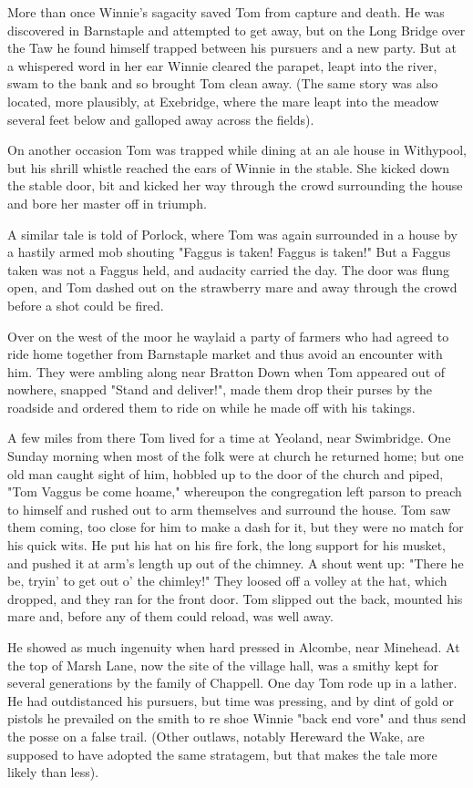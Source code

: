 More than once Winnie's sagacity saved Tom from capture and death. He was discovered in Barnstaple and attempted to get away, but on the Long Bridge over the Taw he found himself trapped between his pursuers and a new party. But at a whispered word in her ear Winnie cleared the parapet, leapt into the river, swam to the bank and so brought Tom clean away. (The same story was also located, more plausibly, at Exebridge, where the mare leapt into the meadow several feet below and galloped away across the fields).

On another occasion Tom was trapped while dining at an ale house in Withypool, but his shrill whistle reached the ears of Winnie in the stable. She kicked down the stable door, bit and kicked her way through the crowd surrounding the house and bore her master off in triumph.

A similar tale is told of Porlock, where Tom was again surrounded in a house by a hastily armed mob shouting "Faggus is taken! Faggus is taken!" But a Faggus taken was not a Faggus held, and audacity carried the day. The door was flung open, and Tom dashed out on the strawberry mare and away through the crowd before a shot could be fired.

Over on the west of the moor he waylaid a party of farmers who had agreed to ride home together from Barnstaple market and thus avoid an encounter with him. They were ambling along near Bratton Down when Tom appeared out of nowhere, snapped "Stand and deliver!", made them drop their purses by the roadside and ordered them to ride on while he made off with his takings.

A few miles from there Tom lived for a time at Yeoland, near Swimbridge. One Sunday morning when most of the folk were at church he returned home; but one old man caught sight of him, hobbled up to the door of the church and piped, "Tom Vaggus be come hoame," whereupon the congregation left parson to preach to himself and rushed out to arm themselves and surround the house. Tom saw them coming, too close for him to make a dash for it, but they were no match for his quick wits. He put his hat on his fire fork, the long support for his musket, and pushed it at arm's length up out of the chimney. A shout went up: "There he be, tryin' to get out o' the chimley!" They loosed off a volley at the hat, which dropped, and they ran for the front door. Tom slipped out the back, mounted his mare and, before any of them could reload, was well away.

He showed as much ingenuity when hard pressed in Alcombe, near Minehead. At the top of Marsh Lane, now the site of the village hall, was a smithy kept for several generations by the family of Chappell. One day Tom rode up in a lather. He had outdistanced his pursuers, but time was pressing, and by dint of gold or pistols he prevailed on the smith to re shoe Winnie "back end vore" and thus send the posse on a false trail. (Other outlaws, notably Hereward the Wake, are supposed to have adopted the same stratagem, but that makes the tale more likely than less).

